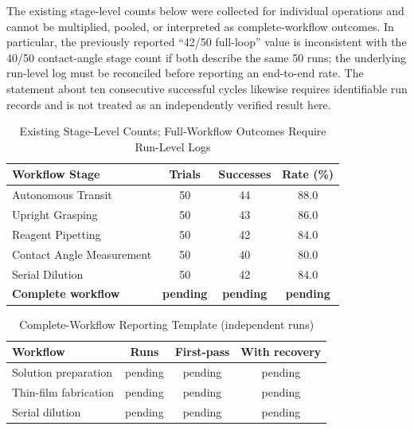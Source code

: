 The existing stage-level counts below were collected for individual operations and cannot be multiplied, pooled, or interpreted as complete-workflow outcomes. In particular, the previously reported ``42/50 full-loop'' value is inconsistent with the 40/50 contact-angle stage count if both describe the same 50 runs; the underlying run-level log must be reconciled before reporting an end-to-end rate. The statement about ten consecutive successful cycles likewise requires identifiable run records and is not treated as an independently verified result here.

\begin{table}[!t]
\renewcommand{\arraystretch}{1.3}
\caption{Existing Stage-Level Counts; Full-Workflow Outcomes Require Run-Level Logs}
\label{tab:end_to_end}
\centering
\begin{tabular}{lccc}
\hline\hline
\textbf{Workflow Stage} & \textbf{Trials} & \textbf{Successes} & \textbf{Rate (\%)} \\ \hline
Autonomous Transit & 50 & 44 & 88.0 \\
Upright Grasping & 50 & 43 & 86.0 \\
Reagent Pipetting & 50 & 42 & 84.0 \\
Contact Angle Measurement & 50 & 40 & 80.0 \\
Serial Dilution & 50 & 42 & 84.0 \\ \hline
\textbf{Complete workflow} & \textbf{pending} & \textbf{pending} & \textbf{pending} \\ \hline\hline
\end{tabular}
\end{table}

\begin{table}[!t]
\caption{Complete-Workflow Reporting Template (independent runs)}
\label{tab:workflow_complete}
\centering
\begin{tabular}{lccc}
\hline\hline
\textbf{Workflow} & \textbf{Runs} & \textbf{First-pass} & \textbf{With recovery} \\ \hline
Solution preparation & pending & pending & pending \\
Thin-film fabrication & pending & pending & pending \\
Serial dilution & pending & pending & pending \\ \hline\hline
\end{tabular}
\end{table}

